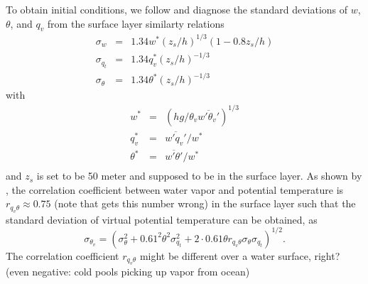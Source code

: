 \documentclass[dvipdfmx,a4paper,10pt]{article}
\begin{document}
% 
% 
% 

To obtain initial conditions, we follow \cite{lenschow80} and diagnose the standard deviations of $w$, $\theta$, and $q_v$ from the surface layer similarty relations
\begin{eqnarray}
 \sigma_w&=&1.34 w^*(z_s/h)^{1/3} (1-0.8z_s/h)\\
   \sigma_{q_t}&=&1.34 q_v^* (z_s/h)^{-1/3}\\\label{eqn:sigmaq}
  \sigma_{\theta}&=&1.34\theta^* (z_s/h)^{-1/3}\label{eqn:sigmath}
\end{eqnarray}
with 
\begin{eqnarray}
  w^*&=&(hg/\theta_v \overline{w'\theta_v'})^{1/3}\\
  q_v^*&=&\overline{w'q_v'}/w^*\\
  \theta^*&=&\overline{w'\theta'}/w^*\\
\end{eqnarray}
and $z_s$ is set to be 50 meter and supposed to be in the surface layer. As shown by \cite[][see their Fig.~12]{sorbjan91}, the correlation coefficient between water vapor and potential temperature is $r_{q_v\theta}\approx 0.75$ {\color{blue}(note that \cite{cheinet03a} gets this number wrong)} in the surface layer such that the standard deviation of virtual potential temperature can be obtained, as  
\begin{equation}\label{eqn:sigmathv}
 \sigma_{\theta_v}= (\sigma_{\theta}^2 + 0.61^2 \theta^2\sigma_{q_t}^2+2\cdot 0.61\theta r_{q_v\theta} \sigma_{\theta} \sigma_{q_t} )^{1/2}.
\end{equation}
{\color{blue}The correlation coefficient $r_{q_v\theta}$ might be different over a water surface, right? (even negative: cold pools picking up vapor from ocean)}
\end{document}
